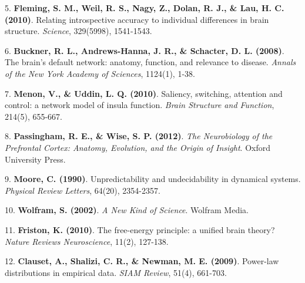 \documentclass[11pt,a4paper,oneside]{ctexart}
\begin{document}
5. \textbf{Fleming, S. M., Weil, R. S., Nagy, Z., Dolan, R. J., \& Lau, H. C. (2010)}. Relating introspective accuracy to individual differences in brain structure. \textit{Science}, 329(5998), 1541-1543.

6. \textbf{Buckner, R. L., Andrews-Hanna, J. R., \& Schacter, D. L. (2008)}. The brain's default network: anatomy, function, and relevance to disease. \textit{Annals of the New York Academy of Sciences}, 1124(1), 1-38.

7. \textbf{Menon, V., \& Uddin, L. Q. (2010)}. Saliency, switching, attention and control: a network model of insula function. \textit{Brain Structure and Function}, 214(5), 655-667.

8. \textbf{Passingham, R. E., \& Wise, S. P. (2012)}. \textit{The Neurobiology of the Prefrontal Cortex: Anatomy, Evolution, and the Origin of Insight}. Oxford University Press.

9. \textbf{Moore, C. (1990)}. Unpredictability and undecidability in dynamical systems. \textit{Physical Review Letters}, 64(20), 2354-2357.

10. \textbf{Wolfram, S. (2002)}. \textit{A New Kind of Science}. Wolfram Media.

11. \textbf{Friston, K. (2010)}. The free-energy principle: a unified brain theory? \textit{Nature Reviews Neuroscience}, 11(2), 127-138.

12. \textbf{Clauset, A., Shalizi, C. R., \& Newman, M. E. (2009)}. Power-law distributions in empirical data. \textit{SIAM Review}, 51(4), 661-703.
\end{document}
